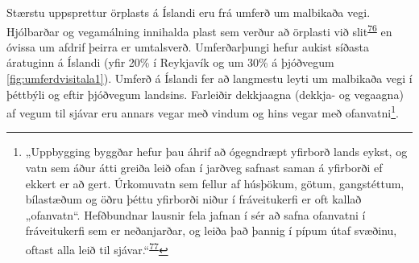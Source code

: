 \documentclass[icelandic,]{book}
\let\rmarkdownfootnote\footnote%
\def\footnote{\protect\rmarkdownfootnote}
\begin{document}
Stærstu uppsprettur örplasts á Íslandi eru frá umferð um malbikaða vegi. Hjólbarðar og vegamálning innihalda plast sem verður að örplasti við slit\textsuperscript{\protect\hyperlink{ref-kreider2010physical}{76}} en óvissa um afdrif þeirra er umtalsverð. Umferðarþungi hefur aukist síðasta áratuginn á Íslandi (yfir 20\% í Reykjavík og um 30\% á þjóðvegum \ref{fig:umferdvisitala1}). Umferð á Íslandi fer að langmestu leyti um malbikaða vegi í þéttbýli og eftir þjóðvegum landsins. Farleiðir dekkjaagna (dekkja- og vegaagna) af vegum til sjávar eru annars vegar með vindum og hins vegar með ofanvatni\footnote{„Uppbygging byggðar hefur þau áhrif að ógegndræpt yfirborð lands eykst, og vatn sem áður átti greiða leið ofan í jarðveg safnast saman á yfirborði ef ekkert er að gert. Úrkomuvatn sem fellur af húsþökum, götum, gangstéttum, bílastæðum og öðru þéttu yfirborði niður í fráveitukerfi er oft kallað „ofanvatn``. Hefðbundnar lausnir fela jafnan í sér að safna ofanvatni í fráveitukerfi sem er neðanjarðar, og leiða það þannig í pípum útaf svæðinu, oftast alla leið til sjávar.``\textsuperscript{\protect\hyperlink{ref-StefanFreyr}{77}}}.
\end{document}
